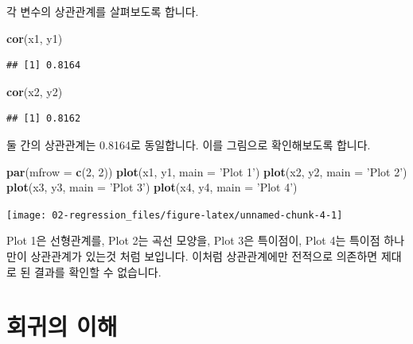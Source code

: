 \documentclass[12pt,]{book}
\newenvironment{Shaded}{\begin{snugshade}}{\end{snugshade}}
\newcommand{\DataTypeTok}[1]{\textcolor[rgb]{0.13,0.29,0.53}{#1}}
\newcommand{\DecValTok}[1]{\textcolor[rgb]{0.00,0.00,0.81}{#1}}
\newcommand{\KeywordTok}[1]{\textcolor[rgb]{0.13,0.29,0.53}{\textbf{#1}}}
\newcommand{\NormalTok}[1]{#1}
\newcommand{\StringTok}[1]{\textcolor[rgb]{0.31,0.60,0.02}{#1}}
\begin{document}
각 변수의 상관관계를 살펴보도록 합니다.

\begin{Shaded}
\begin{Highlighting}[]
\KeywordTok{cor}\NormalTok{(x1, y1)}
\end{Highlighting}
\end{Shaded}

\begin{verbatim}
## [1] 0.8164
\end{verbatim}

\begin{Shaded}
\begin{Highlighting}[]
\KeywordTok{cor}\NormalTok{(x2, y2)}
\end{Highlighting}
\end{Shaded}

\begin{verbatim}
## [1] 0.8162
\end{verbatim}

둘 간의 상관관계는 0.8164로 동일합니다. 이를 그림으로 확인해보도록 합니다.

\begin{Shaded}
\begin{Highlighting}[]
\KeywordTok{par}\NormalTok{(}\DataTypeTok{mfrow =} \KeywordTok{c}\NormalTok{(}\DecValTok{2}\NormalTok{, }\DecValTok{2}\NormalTok{))}
\KeywordTok{plot}\NormalTok{(x1, y1, }\DataTypeTok{main =} \StringTok{'Plot 1'}\NormalTok{)}
\KeywordTok{plot}\NormalTok{(x2, y2, }\DataTypeTok{main =} \StringTok{'Plot 2'}\NormalTok{)}
\KeywordTok{plot}\NormalTok{(x3, y3, }\DataTypeTok{main =} \StringTok{'Plot 3'}\NormalTok{)}
\KeywordTok{plot}\NormalTok{(x4, y4, }\DataTypeTok{main =} \StringTok{'Plot 4'}\NormalTok{)}
\end{Highlighting}
\end{Shaded}

\begin{center}\texttt{[image: 02-regression\_files/figure-latex/unnamed-chunk-4-1]} \end{center}

Plot 1은 선형관계를, Plot 2는 곡선 모양을, Plot 3은 특이점이, Plot 4는 특이점 하나만이 상관관계가 있는것 처럼 보입니다. 이처럼 상관관계에만 전적으로 의존하면 제대로 된 결과를 확인할 수 없습니다.

\hypertarget{uxd68cuxadc0uxc758-uxc774uxd574}{%
\section{회귀의 이해}\label{uxd68cuxadc0uxc758-uxc774uxd574}}
\end{document}
